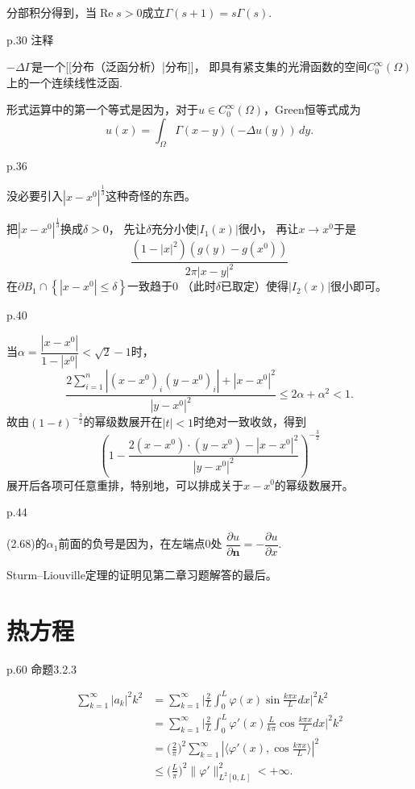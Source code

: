 分部积分得到，当$\operatorname{Re}s>0$成立$\varGamma(s+1)=s\varGamma(s)$.

p.30 注释

$-\Delta\varGamma$是一个[[分布（泛函分析）|分布]]，
即具有紧支集的光滑函数的空间$C_0^\infty(\varOmega)$上的一个连续线性泛函.

形式运算中的第一个等式是因为，对于$u \in C_0^\infty(\varOmega)$，Green恒等式成为
$$u(x)=\int_\varOmega\varGamma(x-y)(-\Delta u(y))\,dy.$$

p.36

没必要引入$|x-x^0|^\frac{1}{3}$这种奇怪的东西。

把$|x-x^0|^\frac{1}{3}$换成$\delta>0$，
先让$\delta$充分小使$|I_1(x)|$很小，
再让$x\rightarrow x^0$于是
$$\frac{(1-|x|^2)(g(y)-g(x^0))}{2\pi|x-y|^2}$$
在$\partial B_1\cap\left\{|x-x^0|\leqslant\delta\right\}$一致趋于$0$
（此时$\delta$已取定）使得$|I_2(x)|$很小即可。

p.40

当$\alpha=\dfrac{|x-x^0|}{1-|x^0|}<\sqrt{2}-1$时，
$$\frac{2\sum\limits_{i=1}^n|(x-x^0)_i(y-x^0)_i|+|x-x^0|^2}{|y-x^0|^2}
\leqslant2\alpha+\alpha^2<1.$$
故由$(1-t)^{-\frac{3}{2}}$的幂级数展开在$|t|<1$时绝对一致收敛，得到
$$\left(1-\frac{2(x-x^0)\cdot(y-x^0)-|x-x^0|^2}{|y-x^0|^2}\right)^{-\frac{3}{2}}$$
展开后各项可任意重排，特别地，可以排成关于$x-x^0$的幂级数展开。

p.44

(2.68)的$\alpha_1$前面的负号是因为，在左端点$0$处
$\dfrac{\partial u}{\partial \boldsymbol{n}}=-\dfrac{\partial u}{\partial x}$.

Sturm--Liouville定理的证明见第二章习题解答的最后。

\section{热方程}
p.60 命题3.2.3

\begin{align*}
    \sum_{k=1}^\infty|a_k|^2k^2
    &=\sum_{k=1}^\infty\bigg|\frac{2}{L}\int_0^L\varphi(x)\sin\frac{k\pi x}{L}dx\bigg|^2k^2\\
    &=\sum_{k=1}^\infty\bigg|\frac{2}{L}\int_0^L\varphi'(x)\frac{L}{k\pi}\cos\frac{k\pi x}{L}dx\bigg|^2k^2\\
    &=\Big(\frac{2}{\pi}\Big)^2\sum_{k=1}^\infty|\langle\varphi'(x),\cos\frac{k\pi x}{L}\rangle|^2\\
    &\leqslant\Big(\frac{L}{\pi}\Big)^2\|\varphi'\|_{L^2[0,L]}^2<+\infty.
\end{align*}

